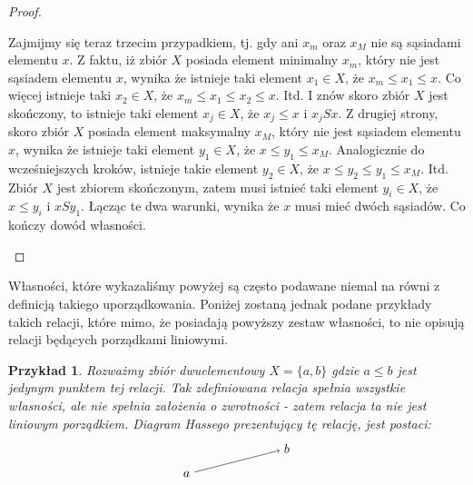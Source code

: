 \documentclass[12pt,a4paper]{report}
\newtheorem{example}{Przykład}
\begin{document}
\begin{proof}
\begin{enumerate}
\begin{itemize}
Zajmijmy się teraz trzecim przypadkiem, tj. gdy ani $x_m$ oraz $x_M$ nie są sąsiadami elementu $x$. Z faktu, iż zbiór $X$ posiada element minimalny $x_m$, który nie jest sąsiadem elementu $x$, wynika że istnieje taki element $x_1 \in X$, że $x_m \leq x_1 \leq x$. Co więcej istnieje taki $x_2 \in X$, że $x_m \leq x_1 \leq x_2 \leq x.$ Itd. I znów skoro zbiór $X$ jest skończony, to istnieje taki element $x_j \in X$, że $x_j \leq x$ i $x_jSx$. Z drugiej strony, skoro zbiór $X$ posiada element maksymalny $x_M$, który nie jest sąsiadem elementu $x$, wynika że istnieje taki element $y_1 \in X$, że $x \leq y_1 \leq x_M$. Analogicznie do wcześniejszych kroków, istnieje takie element $y_2 \in X$, że $x \leq y_2 \leq y_1 \leq x_M$. Itd.  Zbiór $X$ jest zbiorem skończonym, zatem musi istnieć taki element $y_i \in X$, że $x \leq y_i$ i $xSy_1$. 
Łącząc te dwa warunki, wynika że $x$ musi mieć dwóch sąsiadów. Co kończy dowód własności.

\end{itemize}

\end{enumerate}
\end{proof}

Własności, które wykazaliśmy powyżej są często podawane niemal na równi z definicją takiego uporządkowania. Poniżej zostaną jednak podane przykłady takich relacji, które mimo, że posiadają powyższy zestaw własności, to nie opisują relacji będących porządkami liniowymi. 
 
\begin{example}
Rozważmy zbiór dwuelementowy $X = \{ a, b \}$ gdzie $a \leq b$ jest jedynym punktem tej relacji. Tak zdefiniowana relacja spełnia wszystkie własności, ale nie spełnia założenia o zwrotności - zatem relacja ta nie jest liniowym porządkiem. Diagram Hassego prezentujący tę relację, jest postaci: 
$$
\begin{tikzpicture}[scale=.7]
  \node (a) at (-2,0) {$a$};
  \node (b) at (2,1) {$b$};
  \draw [->](a)--(b) ;
\end{tikzpicture}
$$
\end{example}
\end{document}
